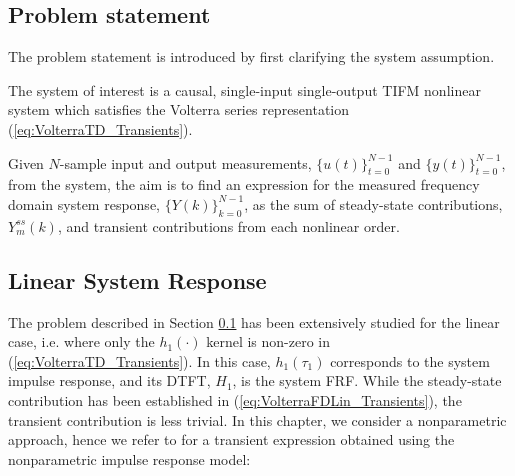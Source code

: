 \subsection{Problem statement}
\label{sec:ProblemState_Transients}

The problem statement is introduced by first clarifying the system assumption.

\begin{assum}
The system of interest is a causal, single-input single-output TIFM nonlinear system which satisfies the Volterra series representation (\ref{eq:VolterraTD_Transients}). 
\end{assum}

Given $N$-sample input and output measurements, $\{u(t)\}_{t=0}^{N-1}$ and $\{y(t)\}_{t=0}^{N-1}$, from the system, the aim is to find an expression for the measured frequency domain system response, $\{Y(k)\}_{k=0}^{N-1}$, as the sum of steady-state contributions, $Y_m^{ss}(k)$, and transient contributions from each nonlinear order.

\subsection{Linear System Response}

The problem described in Section \ref{sec:ProblemState_Transients} has been extensively studied for the linear case, i.e. where only the $h_1(\cdot)$ kernel is non-zero in (\ref{eq:VolterraTD_Transients}). In this case, $h_1(\tau_1)$ corresponds to the system impulse response, and its DTFT, $H_1$, is the system FRF. While the steady-state contribution has been established in (\ref{eq:VolterraFDLin_Transients}), the transient contribution is less trivial. In this chapter, we consider a nonparametric approach, hence we refer to \cite{Lataire2016} for a transient expression obtained using the nonparametric impulse response model:

